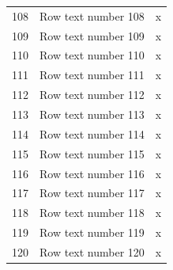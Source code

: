 \documentclass{article}
\begin{document}
\begin{longtable}{|r|p{5cm}|c|}
108&Row text number 108&x\\
109&Row text number 109&x\\
110&Row text number 110&x\\
111&Row text number 111&x\\
112&Row text number 112&x\\
113&Row text number 113&x\\
114&Row text number 114&x\\
115&Row text number 115&x\\
116&Row text number 116&x\\
117&Row text number 117&x\\
118&Row text number 118&x\\
119&Row text number 119&x\\
120&Row text number 120&x\\
\end{longtable}
\end{document}
